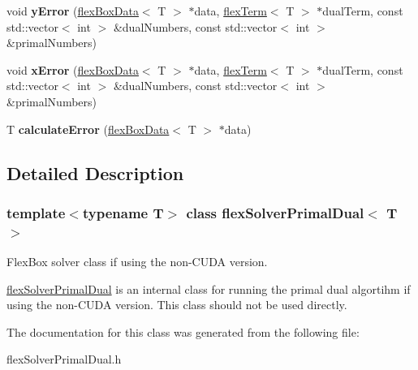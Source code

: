 \begin{DoxyCompactItemize}
void {\bfseries y\+Error} (\hyperlink{classflex_box_data}{flex\+Box\+Data}$<$ T $>$ $\ast$data, \hyperlink{classflex_term}{flex\+Term}$<$ T $>$ $\ast$dual\+Term, const std\+::vector$<$ int $>$ \&dual\+Numbers, const std\+::vector$<$ int $>$ \&primal\+Numbers)
\item 
\mbox{\label{classflex_solver_primal_dual_a533b774914fb5059ca132408bb4c6308}} 
void {\bfseries x\+Error} (\hyperlink{classflex_box_data}{flex\+Box\+Data}$<$ T $>$ $\ast$data, \hyperlink{classflex_term}{flex\+Term}$<$ T $>$ $\ast$dual\+Term, const std\+::vector$<$ int $>$ \&dual\+Numbers, const std\+::vector$<$ int $>$ \&primal\+Numbers)
\item 
\mbox{\label{classflex_solver_primal_dual_a769d3d8fb150ad88e264fde8e5a5e1ab}} 
T {\bfseries calculate\+Error} (\hyperlink{classflex_box_data}{flex\+Box\+Data}$<$ T $>$ $\ast$data)
\end{DoxyCompactItemize}


\subsection{Detailed Description}
\subsubsection*{template$<$typename T$>$\newline
class flex\+Solver\+Primal\+Dual$<$ T $>$}

Flex\+Box solver class if using the non-\/\+C\+U\+DA version. 

\hyperlink{classflex_solver_primal_dual}{flex\+Solver\+Primal\+Dual} is an internal class for running the primal dual algortihm if using the non-\/\+C\+U\+DA version. This class should not be used directly. 

The documentation for this class was generated from the following file\+:\begin{DoxyCompactItemize}
\item 
flex\+Solver\+Primal\+Dual.\+h\end{DoxyCompactItemize}
